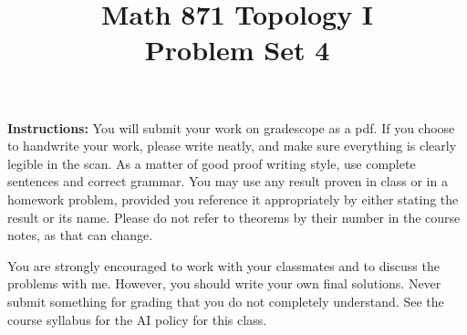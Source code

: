 \documentclass[12pt]{article}
\title{Math 871 Topology I\\[-0.1em]
\large Problem Set 4}
\author{}
\date{}
\begin{document}
\maketitle


	
\thispagestyle{fancy}
\pagestyle{fancy}





{\bf Instructions:}
You will submit your work on gradescope as a pdf. If you choose to handwrite your work, please write neatly, and make sure everything is clearly legible in the scan.
As a matter of good proof writing style, use complete sentences and correct grammar. You may use any result proven in class or in a homework problem, provided you reference it appropriately by either stating the result or its name. Please do not refer to theorems by their number in the course notes, as that can change.

You are strongly encouraged to work with your classmates and to discuss the problems with me. However, you should write your own final solutions.
Never submit something for grading that you do not completely understand. 
See the course syllabus for the AI policy for this class.
	
\vspace{2em}
\end{document}
